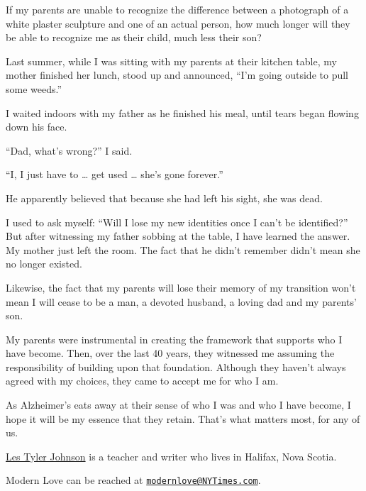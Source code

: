 If my parents are unable to recognize the difference between a
photograph of a white plaster sculpture and one of an actual person, how
much longer will they be able to recognize me as their child, much less
their son?

Last summer, while I was sitting with my parents at their kitchen table,
my mother finished her lunch, stood up and announced, ``I'm going
outside to pull some weeds.''

I waited indoors with my father as he finished his meal, until tears
began flowing down his face.

``Dad, what's wrong?'' I said.

``I, I just have to \ldots{} get used \ldots{} she's gone forever.''

He apparently believed that because she had left his sight, she was
dead.

I used to ask myself: ``Will I lose my new identities once I can't be
identified?'' But after witnessing my father sobbing at the table, I
have learned the answer. My mother just left the room. The fact that he
didn't remember didn't mean she no longer existed.

Likewise, the fact that my parents will lose their memory of my
transition won't mean I will cease to be a man, a devoted husband, a
loving dad and my parents' son.

My parents were instrumental in creating the framework that supports who
I have become. Then, over the last 40 years, they witnessed me assuming
the responsibility of building upon that foundation. Although they
haven't always agreed with my choices, they came to accept me for who I
am.

As Alzheimer's eats away at their sense of who I was and who I have
become, I hope it will be my essence that they retain. That's what
matters most, for any of us.

\href{https://www.lestjohnson.com/}{Les Tyler Johnson} is a teacher and
writer who lives in Halifax, Nova Scotia.

Modern Love can be reached at
\href{mailto:modernlove@NYTimes.com}{\nolinkurl{modernlove@NYTimes.com}}.

